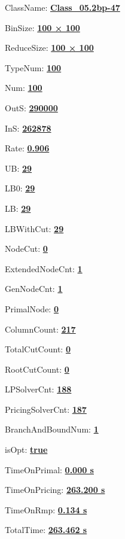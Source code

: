 \documentclass[11pt]{article}
\begin{document}
\pagestyle{empty}


ClassName: \underline{\textbf{Class_05.2bp-47}}
\par
BinSize: \underline{\textbf{100 × 100}}
\par
ReduceSize: \underline{\textbf{100 × 100}}
\par
TypeNum: \underline{\textbf{100}}
\par
Num: \underline{\textbf{100}}
\par
OutS: \underline{\textbf{290000}}
\par
InS: \underline{\textbf{262878}}
\par
Rate: \underline{\textbf{0.906}}
\par
UB: \underline{\textbf{29}}
\par
LB0: \underline{\textbf{29}}
\par
LB: \underline{\textbf{29}}
\par
LBWithCut: \underline{\textbf{29}}
\par
NodeCut: \underline{\textbf{0}}
\par
ExtendedNodeCnt: \underline{\textbf{1}}
\par
GenNodeCnt: \underline{\textbf{1}}
\par
PrimalNode: \underline{\textbf{0}}
\par
ColumnCount: \underline{\textbf{217}}
\par
TotalCutCount: \underline{\textbf{0}}
\par
RootCutCount: \underline{\textbf{0}}
\par
LPSolverCnt: \underline{\textbf{188}}
\par
PricingSolverCnt: \underline{\textbf{187}}
\par
BranchAndBoundNum: \underline{\textbf{1}}
\par
isOpt: \underline{\textbf{true}}
\par
TimeOnPrimal: \underline{\textbf{0.000 s}}
\par
TimeOnPricing: \underline{\textbf{263.200 s}}
\par
TimeOnRmp: \underline{\textbf{0.134 s}}
\par
TotalTime: \underline{\textbf{263.462 s}}
\par
\newpage


\end{document}
